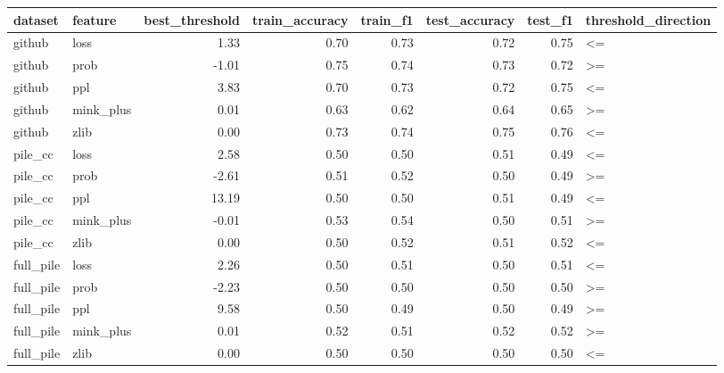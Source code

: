 \begin{tabular}{llrrrrrl}
\toprule
   dataset &   feature & best\_threshold & train\_accuracy & train\_f1 & test\_accuracy & test\_f1 & threshold\_direction \\
\midrule
    github &      loss &           1.33 &           0.70 &     0.73 &          0.72 &    0.75 &                  <= \\
    github &      prob &          -1.01 &           0.75 &     0.74 &          0.73 &    0.72 &                  >= \\
    github &       ppl &           3.83 &           0.70 &     0.73 &          0.72 &    0.75 &                  <= \\
    github & mink\_plus &           0.01 &           0.63 &     0.62 &          0.64 &    0.65 &                  >= \\
    github &      zlib &           0.00 &           0.73 &     0.74 &          0.75 &    0.76 &                  <= \\
   pile\_cc &      loss &           2.58 &           0.50 &     0.50 &          0.51 &    0.49 &                  <= \\
   pile\_cc &      prob &          -2.61 &           0.51 &     0.52 &          0.50 &    0.49 &                  >= \\
   pile\_cc &       ppl &          13.19 &           0.50 &     0.50 &          0.51 &    0.49 &                  <= \\
   pile\_cc & mink\_plus &          -0.01 &           0.53 &     0.54 &          0.50 &    0.51 &                  >= \\
   pile\_cc &      zlib &           0.00 &           0.50 &     0.52 &          0.51 &    0.52 &                  <= \\
 full\_pile &      loss &           2.26 &           0.50 &     0.51 &          0.50 &    0.51 &                  <= \\
 full\_pile &      prob &          -2.23 &           0.50 &     0.50 &          0.50 &    0.50 &                  >= \\
 full\_pile &       ppl &           9.58 &           0.50 &     0.49 &          0.50 &    0.49 &                  >= \\
 full\_pile & mink\_plus &           0.01 &           0.52 &     0.51 &          0.52 &    0.52 &                  >= \\
 full\_pile &      zlib &           0.00 &           0.50 &     0.50 &          0.50 &    0.50 &                  <= \\

\end{tabular}

